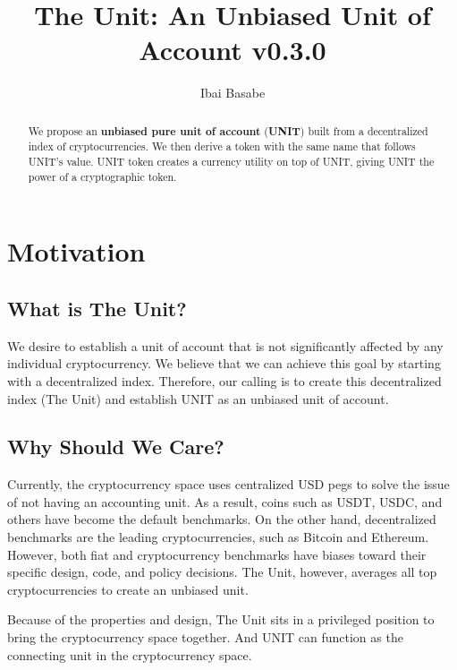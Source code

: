 \documentclass[12pt]{article}
\title{The Unit: An Unbiased Unit of Account v0.3.0}
\author{Ibai Basabe}
\begin{document}
\pagecolor{yellow!15!}

\date{}

\maketitle


\begin{abstract}
We propose an {\bf unbiased pure unit of account} ({\bf UNIT}) built from a decentralized index of cryptocurrencies. We then derive a token with the same name that follows UNIT's value. UNIT token creates a currency utility on top of UNIT, giving UNIT the power of a cryptographic token.
\end{abstract}


\tableofcontents
\newpage

\section{Motivation}

\subsection{What is The Unit?}

We desire to establish a unit of account that is not significantly affected by any individual cryptocurrency. We believe that we can achieve this goal by starting with a decentralized index. Therefore, our calling is to create this decentralized index (The Unit) and establish UNIT as an unbiased unit of account.

\subsection{Why Should We Care?}

Currently, the cryptocurrency space uses centralized USD pegs to solve the issue of not having an accounting unit. As a result, coins such as USDT, USDC, and others have become the default benchmarks. On the other hand, decentralized benchmarks are the leading cryptocurrencies, such as Bitcoin and Ethereum. However, both fiat and cryptocurrency benchmarks have biases toward their specific design, code, and policy decisions. The Unit, however, averages all top cryptocurrencies to create an unbiased unit.

Because of the properties and design, The Unit sits in a privileged position to bring the cryptocurrency space together. And UNIT can function as the connecting unit in the cryptocurrency space.
\end{document}
